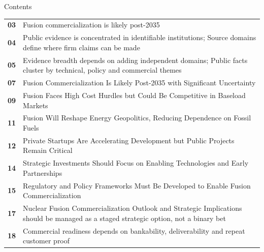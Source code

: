 \documentclass[10pt,a4paper]{article}
\begin{document}
\clearpage
\noindent{}\par\vspace{8pt}
{\sffamily\fontsize{26}{31}\selectfont\color{BONavy} Contents}\par\vspace{10pt}
\begin{minipage}[t]{0.57\linewidth}
\begin{tabularx}{\linewidth}{p{12mm}Y}
\textcolor{BOGreen}{\bfseries 03} & {\footnotesize Fusion commercialization is likely post-2035} \\[4pt]
\textcolor{BOGreen}{\bfseries 04} & {\footnotesize Public evidence is concentrated in identifiable institutions; Source domains define where firm claims can be made} \\[4pt]
\textcolor{BOGreen}{\bfseries 05} & {\footnotesize Evidence breadth depends on adding independent domains; Public facts cluster by technical, policy and commercial themes} \\[4pt]
\textcolor{BOGreen}{\bfseries 07} & {\footnotesize Fusion Commercialization Is Likely Post-2035 with Significant Uncertainty} \\[4pt]
\textcolor{BOGreen}{\bfseries 09} & {\footnotesize Fusion Faces High Cost Hurdles but Could Be Competitive in Baseload Markets} \\[4pt]
\textcolor{BOGreen}{\bfseries 11} & {\footnotesize Fusion Will Reshape Energy Geopolitics, Reducing Dependence on Fossil Fuels} \\[4pt]
\textcolor{BOGreen}{\bfseries 12} & {\footnotesize Private Startups Are Accelerating Development but Public Projects Remain Critical} \\[4pt]
\textcolor{BOGreen}{\bfseries 14} & {\footnotesize Strategic Investments Should Focus on Enabling Technologies and Early Partnerships} \\[4pt]
\textcolor{BOGreen}{\bfseries 15} & {\footnotesize Regulatory and Policy Frameworks Must Be Developed to Enable Fusion Commercialization} \\[4pt]
\textcolor{BOGreen}{\bfseries 17} & {\footnotesize Nuclear Fusion Commercialization Outlook and Strategic Implications should be managed as a staged strategic option, not a binary bet} \\[4pt]
\textcolor{BOGreen}{\bfseries 18} & {\footnotesize Commercial readiness depends on bankability, deliverability and repeat customer proof} \\[4pt]

\end{tabularx}
\end{minipage}
\end{document}
